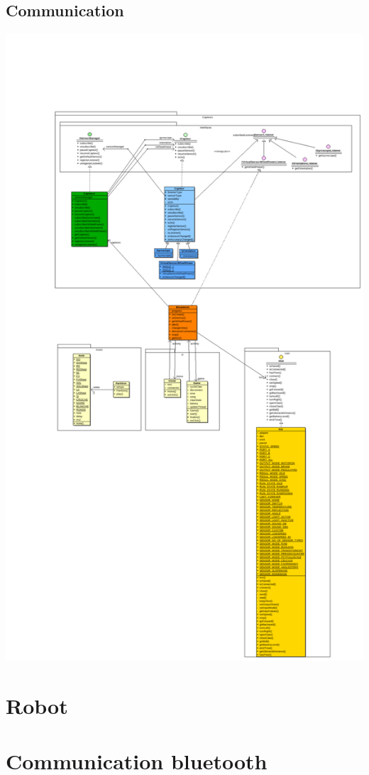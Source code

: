 \documentclass[10pt,a4paper]{article}
\begin{document}
	\subsection{Communication}
	\includegraphics[width=15 cm]{diagramme.pdf} \\

\section{Robot}
	\section{Communication bluetooth}
\end{document}

